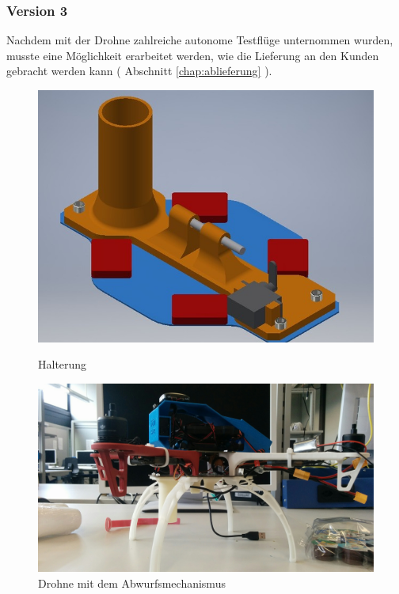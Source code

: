 \subsubsection{Version 3}
Nachdem mit der Drohne zahlreiche autonome Testflüge unternommen wurden, musste eine Möglichkeit erarbeitet werden, wie die Lieferung an den Kunden gebracht werden kann ( Abschnitt \ref{chap:ablieferung} ).

\begin{figure}[H]
	\centering
	\begin{minipage}[b]{0.4\textwidth}
		\includegraphics[width=\textwidth]{images/hardware/parachute-model.jpg}
		\caption{Halterung}
		\label{fig:parachute-mode}
	\end{minipage}
	\hfill
	\begin{minipage}[b]{0.4\textwidth}
		\includegraphics[width=\textwidth]{images/hardware/drone-with-servo.jpg}
		\caption{Drohne mit dem Abwurfsmechanismus}
		\label{fig:drone-with-servo}
	\end{minipage}
\end{figure}


